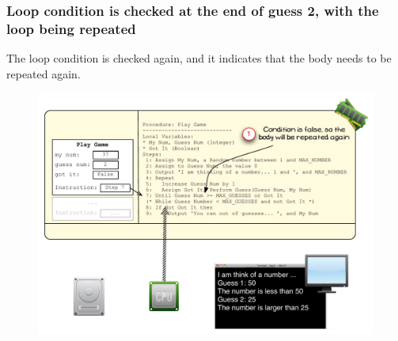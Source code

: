 
\clearpage
\subsubsection{Loop condition is checked at the end of guess 2, with the loop being repeated} %
\label{ssub:loop_condition_is_checked_at_the_end_of_guess_2}

The loop condition is checked again, and it indicates that the body needs to be repeated again.

\begin{figure}[htbp]
   \centering
   \includegraphics[width=\textwidth]{./topics/control-flow/images/PlayGame7} 
   \caption{}
   \label{fig:play-game-7}
\end{figure}

